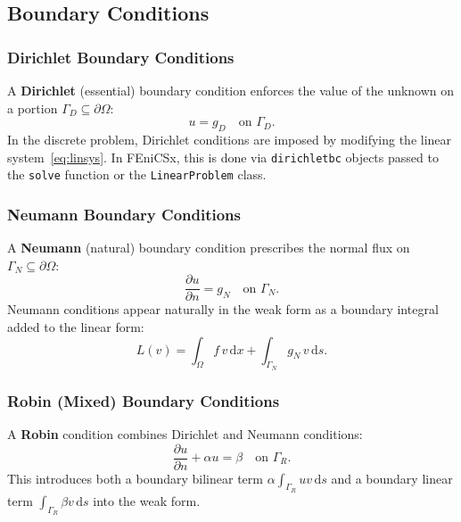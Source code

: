 \documentclass[11pt]{article}
\newcommand{\dx}{\,\mathrm{d}x}
\newcommand{\ds}{\,\mathrm{d}s}
\newcommand{\domain}{\Omega}
\newcommand{\boundary}{\partial\Omega}
\begin{document}
\subsection{Boundary Conditions}

\subsubsection{Dirichlet Boundary Conditions}

A \textbf{Dirichlet} (essential) boundary condition enforces the value of
the unknown on a portion $\Gamma_D \subseteq \boundary$:
\begin{equation*}
  u = g_D \quad \text{on } \Gamma_D.
\end{equation*}
In the discrete problem, Dirichlet conditions are imposed by modifying the
linear system~\eqref{eq:linsys}.
In FEniCSx, this is done via \texttt{dirichletbc} objects passed to the
\texttt{solve} function or the \texttt{LinearProblem} class.

\subsubsection{Neumann Boundary Conditions}

A \textbf{Neumann} (natural) boundary condition prescribes the normal flux
on $\Gamma_N \subseteq \boundary$:
\begin{equation*}
  \frac{\partial u}{\partial n} = g_N \quad \text{on } \Gamma_N.
\end{equation*}
Neumann conditions appear naturally in the weak form as a boundary integral
added to the linear form:
\begin{equation*}
  L(v) = \int_\domain f\,v \dx + \int_{\Gamma_N} g_N\,v \ds.
\end{equation*}

\subsubsection{Robin (Mixed) Boundary Conditions}

A \textbf{Robin} condition combines Dirichlet and Neumann conditions:
\begin{equation*}
  \frac{\partial u}{\partial n} + \alpha u = \beta
  \quad \text{on } \Gamma_R.
\end{equation*}
This introduces both a boundary bilinear term $\alpha\int_{\Gamma_R} u v \ds$
and a boundary linear term $\int_{\Gamma_R}\beta v \ds$ into the weak form.
\end{document}
